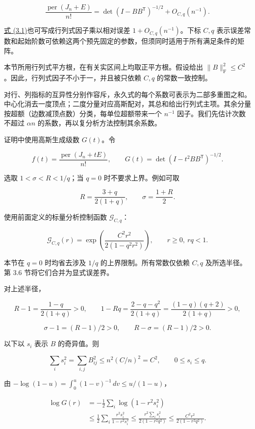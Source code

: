 \documentclass[11pt,a4paper]{article}
\begin{document}
\begin{equation}
\frac{\operatorname{per}(J_n+E)}{n!}
=\det(I-BB^{\mathsf T})^{-1/2}+O_{C,q}(n^{-1}).
\tag{3.1}
\label{eq-uniform-permanent}
\end{equation}

\hyperref[eq-uniform-permanent]{式 (3.1)}也可写成行列式因子乘以相对误差 \(1+O_{C,q}(n^{-1})\)。下标 \(C,q\) 表示误差常数和起始阶数可依赖这两个预先固定的参数，但须同时适用于所有满足条件的矩阵。

本节所用行列式平方根，在有关实区间上均取正平方根。假设给出 \(\|B\|_{\mathrm F}^2\le C^2\)。因此，行列式因子不小于一，并且被只依赖 \(C,q\) 的常数一致控制。

对行、列指标的互异性分别作容斥，永久式的每个系数可表示为二部多重图之和。中心化消去一度顶点；二度分量对应高斯配对，其总和给出行列式主项。其余分量按超额（边数减顶点数）分类，每单位超额带来一个 \(n^{-1}\) 因子。我们先估计次数不超过 \(\alpha n\) 的系数，再以复分析方法控制其余系数。

证明中使用高斯生成级数 \(G(t)\)。令

\[
f(t)=\frac{\operatorname{per}(J_n+tE)}{n!},
\qquad G(t)=\det(I-t^2BB^{\mathsf T})^{-1/2}.
\]

选取 \(1<\sigma<R<1/q\)；当 \(q=0\) 时不要求上界。例如可取

\[
R=\frac{3+q}{2(1+q)},\qquad \sigma=\frac{1+R}{2}.
\]

使用前面定义的标量分析控制函数 \(\mathcal G_{C,q}\)：

\[
\mathcal G_{C,q}(r)=\exp\left(\frac{C^2r^2}{2(1-q^2r^2)}\right),
\qquad r\ge0,\ rq<1.
\]

本节在 \(q=0\) 时均省去涉及 \(1/q\) 的上界限制。所有常数仅依赖 \(C,q\) 及所选半径。第 3.6 节将它们合并为显式误差界。

对上述半径，

\[
R-1=\frac{1-q}{2(1+q)}>0,\qquad
1-Rq=\frac{2-q-q^2}{2(1+q)}=\frac{(1-q)(q+2)}{2(1+q)}>0,
\]

\[
\sigma-1=(R-1)/2>0,\qquad R-\sigma=(R-1)/2>0.
\]

以下以 \(s_i\) 表示 \(B\) 的奇异值。则

\[
\sum_i s_i^2=\sum_{i,j}B_{ij}^2\le n^2(C/n)^2=C^2,\qquad
0\le s_i\le q.
\]

由 \(-\log(1-u)=\int_0^u(1-v)^{-1}\,dv\le u/(1-u)\)，

\[
\begin{aligned}
\log G(r)&=-\frac12\sum_i\log(1-r^2s_i^2)\\
&\le\frac12\sum_i\frac{r^2s_i^2}{1-r^2s_i^2}
\le\frac{r^2\sum_i s_i^2}{2(1-r^2q^2)}
\le\frac{C^2r^2}{2(1-r^2q^2)}.
\end{aligned}
\]
\end{document}
